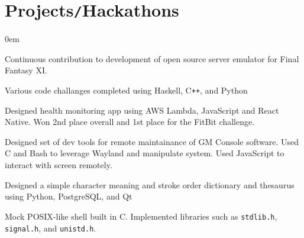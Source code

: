 \documentclass[11pt]{article}
\begin{document}
\section*{Projects\texttt{/}Hackathons}
\vspace*{-8pt}\hspace*{10pt}\begin{minipage}{0.93\textwidth}
    \begin{description}
        \itemsep0em
        \raggedright
        \item[AirSkyBoat \href{https://github.com/luke-belinc/AirSkyBoat}{\fontsize{9pt}{9pt}\faLink}] Continuous contribution to 
            development of open source server emulator for Final Fantasy XI.
        \item[Advent of Code \href{https://github.com/luke-belinc/AOC-2020}{\fontsize{9pt}{9pt}\faLink}] Various code challanges 
            completed using Haskell, C\texttt{++}, and Python
        \item[DHack \href{https://github.com/kraudo/keepup}{\fontsize{9pt}{9pt}\faLink}] Designed health monitoring app using AWS 
            Lambda, JavaScript and React Native. Won 2nd place overall and 1st place for the FitBit challenge.
        \item[MHacks 8] Designed set of dev tools for remote maintainance of GM Console software. Used C and Bash to leverage Wayland 
            and manipulate system. Used JavaScript to interact with screen remotely.
        \item[Chinese Character Dictionary \href{https://github.com/luke-belinc/chinese-char-dict}{\fontsize{9pt}{9pt}\faLink}] 
            Designed a simple character meaning and stroke order dictionary and thesaurus using Python, PostgreSQL, and Qt
        \item[Mock Shell \href{https://github.com/luke-belinc/c-fun}{\fontsize{9pt}{9pt}\faLink}] Mock POSIX-like shell built in C. Implemented libraries such as \texttt{stdlib.h}, \texttt{signal.h}, 
            and \texttt{unistd.h}.
    \end{description}
\end{minipage}
\end{document}
